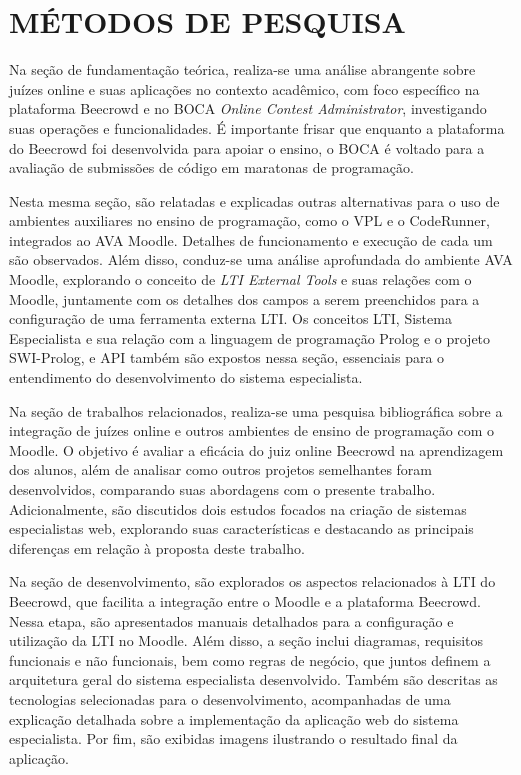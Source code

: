 \section{MÉTODOS DE PESQUISA}

Na seção de fundamentação teórica, realiza-se uma análise abrangente sobre juízes online e suas aplicações no contexto acadêmico, com foco específico na plataforma Beecrowd e no BOCA \textit{Online Contest Administrator}, investigando suas operações e funcionalidades. É importante frisar que enquanto a plataforma do Beecrowd foi desenvolvida para apoiar o ensino, o BOCA é voltado para a avaliação de submissões de código em maratonas de programação. 

Nesta mesma seção, são relatadas e explicadas outras alternativas para o uso de ambientes auxiliares no ensino de programação, como o VPL e o CodeRunner, integrados ao AVA Moodle. Detalhes de funcionamento e execução de cada um são observados. Além disso, conduz-se uma análise aprofundada do ambiente AVA Moodle, explorando o conceito de \textit{LTI External Tools} e suas relações com o Moodle, juntamente com os detalhes dos campos a serem preenchidos para a configuração de uma ferramenta externa LTI. Os conceitos LTI, Sistema Especialista e sua relação com a linguagem de programação Prolog e o projeto SWI-Prolog, e API também são expostos nessa seção, essenciais para o entendimento do desenvolvimento do sistema especialista. 

Na seção de trabalhos relacionados, realiza-se uma pesquisa bibliográfica sobre a integração de juízes online e outros ambientes de ensino de programação com o Moodle. O objetivo é avaliar a eficácia do juiz online Beecrowd na aprendizagem dos alunos, além de analisar como outros projetos semelhantes foram desenvolvidos, comparando suas abordagens com o presente trabalho. Adicionalmente, são discutidos dois estudos focados na criação de sistemas especialistas web, explorando suas características e destacando as principais diferenças em relação à proposta deste trabalho.

Na seção de desenvolvimento, são explorados os aspectos relacionados à LTI do Beecrowd, que facilita a integração entre o Moodle e a plataforma Beecrowd. Nessa etapa, são apresentados manuais detalhados para a configuração e utilização da LTI no Moodle. Além disso, a seção inclui diagramas, requisitos funcionais e não funcionais, bem como regras de negócio, que juntos definem a arquitetura geral do sistema especialista desenvolvido. Também são descritas as tecnologias selecionadas para o desenvolvimento, acompanhadas de uma explicação detalhada sobre a implementação da aplicação web do sistema especialista. Por fim, são exibidas imagens ilustrando o resultado final da aplicação.

